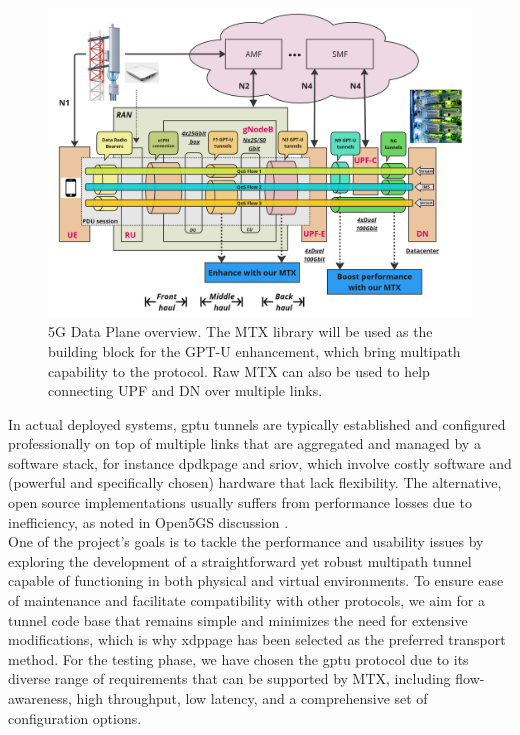 
\begin{figure}[H]
	\centering
	\includegraphics[width=1.0\textwidth]{resources/images/5g_dp_enhancement.PNG}
	\caption{5G Data Plane overview. The MTX library will be used as the building block for the GPT-U enhancement, which bring multipath capability to the protocol. Raw MTX can also be used to help connecting UPF and DN over multiple links.}
    \label{fig:related_work:5g_dp_enhancement}
\end{figure}

In actual deployed systems, \ac{gptu} tunnels are typically established and configured professionally on top of multiple links that are aggregated and managed by a software stack, for instance \ac{dpdkpage} and \ac{sriov}, which involve costly software and (powerful and specifically chosen) hardware that lack flexibility.
The alternative, open source implementations usually suffers from performance losses due to inefficiency, as noted in Open5GS discussion \cite{open5gs_github_udp_perf_cap}\cite{open5gs_github_dpdk}.
\\

One of the project's goals is to tackle the performance and usability issues by exploring the development of a straightforward yet robust multipath tunnel capable of functioning in both physical and virtual environments. 
To ensure ease of maintenance and facilitate compatibility with other protocols, we aim for a tunnel code base that remains simple and minimizes the need for extensive modifications, which is why \ac{xdppage} has been selected as the preferred transport method.
For the testing phase, we have chosen the \ac{gptu} protocol due to its diverse range of requirements that can be supported by MTX, including flow-awareness, high throughput, low latency, and a comprehensive set of configuration options.



